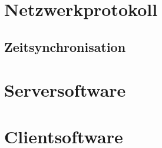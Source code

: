 \section{Netzwerkprotokoll}
\subsection{Zeitsynchronisation}
\section{Serversoftware}

\section{Clientsoftware}
\fi